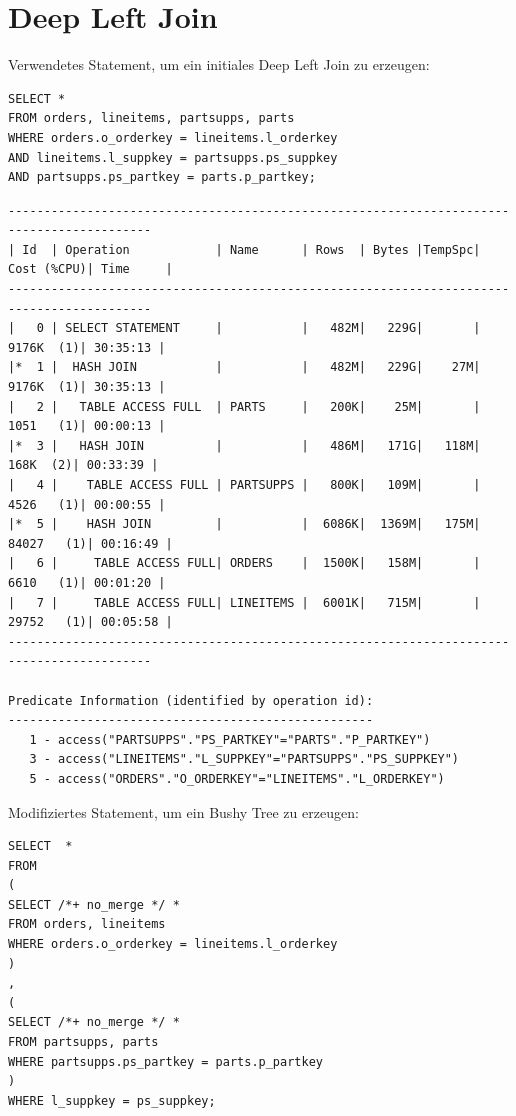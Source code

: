\documentclass[10pt]{article}
\begin{document}
\section{Deep Left Join}
Verwendetes Statement, um ein initiales Deep Left Join zu erzeugen:
\begin{lstlisting}[style=sql]
SELECT *
FROM orders, lineitems, partsupps, parts
WHERE orders.o_orderkey = lineitems.l_orderkey
AND lineitems.l_suppkey = partsupps.ps_suppkey
AND partsupps.ps_partkey = parts.p_partkey;
\end{lstlisting}
\begin{lstlisting}[style=queryexecutionplan]
------------------------------------------------------------------------------------------
| Id  | Operation            | Name      | Rows  | Bytes |TempSpc| Cost (%CPU)| Time     |
------------------------------------------------------------------------------------------
|   0 | SELECT STATEMENT     |           |   482M|   229G|       |  9176K  (1)| 30:35:13 |
|*  1 |  HASH JOIN           |           |   482M|   229G|    27M|  9176K  (1)| 30:35:13 |
|   2 |   TABLE ACCESS FULL  | PARTS     |   200K|    25M|       |  1051   (1)| 00:00:13 |
|*  3 |   HASH JOIN          |           |   486M|   171G|   118M|   168K  (2)| 00:33:39 |
|   4 |    TABLE ACCESS FULL | PARTSUPPS |   800K|   109M|       |  4526   (1)| 00:00:55 |
|*  5 |    HASH JOIN         |           |  6086K|  1369M|   175M| 84027   (1)| 00:16:49 |
|   6 |     TABLE ACCESS FULL| ORDERS    |  1500K|   158M|       |  6610   (1)| 00:01:20 |
|   7 |     TABLE ACCESS FULL| LINEITEMS |  6001K|   715M|       | 29752   (1)| 00:05:58 |
------------------------------------------------------------------------------------------

Predicate Information (identified by operation id):
---------------------------------------------------
   1 - access("PARTSUPPS"."PS_PARTKEY"="PARTS"."P_PARTKEY")
   3 - access("LINEITEMS"."L_SUPPKEY"="PARTSUPPS"."PS_SUPPKEY")
   5 - access("ORDERS"."O_ORDERKEY"="LINEITEMS"."L_ORDERKEY")
\end{lstlisting}
Modifiziertes Statement, um ein Bushy Tree zu erzeugen:
\begin{lstlisting}[style=sql]
SELECT  *
FROM 
(
SELECT /*+ no_merge */ *
FROM orders, lineitems
WHERE orders.o_orderkey = lineitems.l_orderkey
)
,
(
SELECT /*+ no_merge */ *
FROM partsupps, parts
WHERE partsupps.ps_partkey = parts.p_partkey
)
WHERE l_suppkey = ps_suppkey;
\end{lstlisting}
\end{document}
